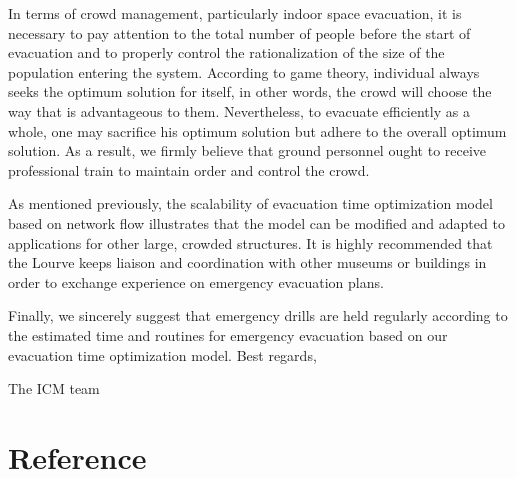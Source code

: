 \documentclass{mcmthesis}
\begin{document}
In terms of crowd management,  particularly indoor space evacuation, it is necessary to pay attention to the total number of people before the start of evacuation and to properly control the rationalization of the size of the population entering the system. According to game theory, individual always seeks the optimum solution for itself, in other words, the crowd will choose the way that is advantageous to them. Nevertheless, to evacuate efficiently as a whole, one may sacrifice his optimum solution but adhere to the overall optimum solution. As a result, we firmly believe that ground personnel ought to receive professional train to maintain order and control the crowd.

As mentioned previously, the scalability of evacuation time optimization model based on network flow illustrates that the model can be modified and adapted to applications for other large, crowded structures. It is highly recommended that the Lourve keeps liaison and coordination with other museums or buildings in order to exchange experience on emergency evacuation plans. 

Finally, we sincerely suggest that emergency drills are held regularly according to the estimated time and routines for emergency evacuation based on our evacuation time optimization model.
Best regards,

The ICM team


	\section{Reference}
	
	
\end{document}

